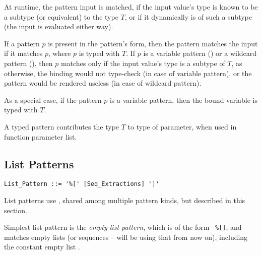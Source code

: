 At runtime, the pattern input is matched, if the input value's type is known to be a subtype (or equivalent) to the type $T$, or if it dynamically is of such a subtype (the input is evaluated either way). 

If a pattern $p$ is present in the pattern's form, then the pattern matches the input if it matches $p$, where $p$ is typed with $T$. If $p$ is a variable pattern () or a wildcard pattern (), then $p$ matches only if the input value's type is a subtype of $T$, as otherwise, the binding would not type-check (in case of variable pattern), or the pattern would be rendered useless (in case of wildcard pattern). 

As a special case, if the pattern $p$ is a variable pattern, then the bound variable is typed with $T$. 

A typed pattern contributes the type $T$ to type of parameter, when used in function parameter list. 





\subsection{List Patterns}
\label{sec:list-patterns}

\syntax\begin{lstlisting}
List_Pattern ::= '%[' [Seq_Extractions] ']'
\end{lstlisting}

List patterns use , shared among multiple pattern kinds, but described in this section. 

Simplest list pattern is the {\em empty list pattern}, which is of the form ~\lstinline!%[]!, and matches empty lists (or sequences -- will be using that from now on), including the constant empty list . 

